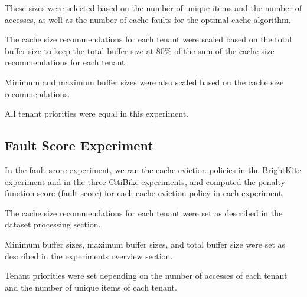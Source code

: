 These sizes were selected based on the number of unique items and the number of accesses, as 
well as the number of cache faults for the optimal cache algorithm.

The cache size recommendations for each tenant were scaled based on the total buffer size to 
keep the total buffer size at 80\% of the sum of the cache size recommendations for each tenant.

Minimum and maximum buffer sizes were also scaled based on the cache size recommendations.

All tenant priorities were equal in this experiment.

\subsection{Fault Score Experiment}

In the fault score experiment, we ran the cache eviction policies in the BrightKite experiment 
and in the three CitiBike experiments, and computed the penalty function score (fault score) 
for each cache eviction policy in each experiment.

The cache size recommendations for each tenant were set as described in the dataset processing 
section.

Minimum buffer sizes, maximum buffer sizes, and total buffer size were set as described in 
the experiments overview section.

Tenant priorities were set depending on the number of accesses of each tenant and the number of
unique items of each tenant.